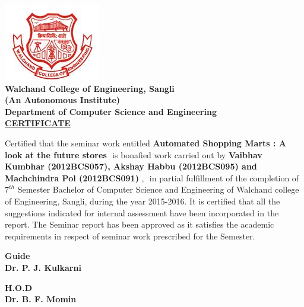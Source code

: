 \documentclass[a4paper,oneside,11pt,english]{report}
\begin{document}
\newpage
{	
	\linespread{2}
	
	\begin{center}
		\includegraphics[width=.2\linewidth]{logo/walchand.jpg}\\[.5cm]
		\textbf{\Large Walchand College of Engineering, Sangli }\\
		\textbf {(An Autonomous Institute)}\\[.5cm]
		\textbf {\LARGE Department of Computer Science and Engineering}\\[1cm]
		{\color{blue}\huge\textbf{{\underline{CERTIFICATE}}}}\\[1cm]
	\end{center}
	\linespread{1.6}
	\par \large Certified that the seminar work entitled \textbf{Automated Shopping Marts : A look at the future stores}  ​ is bonafied work carried out by \textbf{Vaibhav Kumbhar (2012BCS057), Akshay Habbu (2012BCS095) and Machchindra Pol (2012BCS091)} , ​ in partial fulfillment of the completion of $ 7^{th} $ Semester Bachelor of Computer Science and Engineering of Walchand college of Engineering, Sangli, during the year 2015-2016. It is certified that all the suggestions indicated for internal assessment have been incorporated in the ​report. The Seminar report has been approved as it ​satisfies the academic requirements in respect of seminar work prescribed for the Semester. \\[4cm]
	\begin{minipage}{.5\linewidth}
		\begin{flushleft}
			\textbf{Guide}\\
			\textbf{Dr. P. J. Kulkarni}\\
		\end{flushleft}
	\end{minipage}
	\begin{minipage}{.5\linewidth}
		\begin{flushright}
			
			\textbf{H.O.D}\\
			\textbf{Dr. B. F. Momin}\\
		\end{flushright}
	\end{minipage}
	
}
\end{document}
